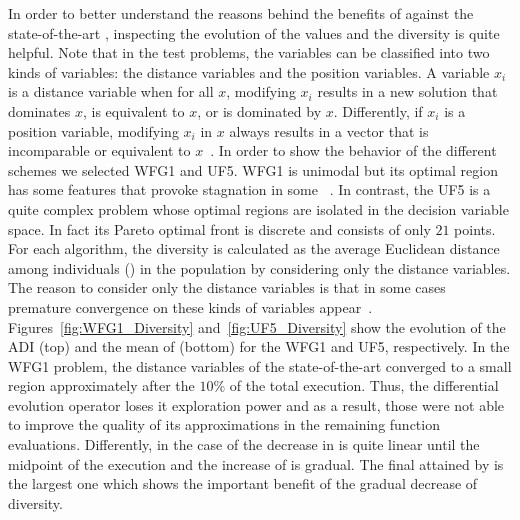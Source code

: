 In order to better understand the reasons behind the benefits of \AVSDMOEAD{} against the state-of-the-art \MOEAS{},
inspecting the evolution of the \HV{} values and the diversity is quite helpful.
%
Note that in the \WFG{} test problems, the variables can be classified into two kinds of variables: 
the distance variables and the position variables.
%
A variable $x_i$ is a distance variable when for all $x$, modifying $x_i$ results in a new solution 
that dominates $x$, is equivalent to $x$, or is dominated by $x$.
%
Differently, if $x_i$ is a position variable, modifying $x_i$ in $x$ always results in a vector that is 
incomparable or equivalent to $x$~\cite{huband2006review}.
%
In order to show the behavior of the different schemes we selected WFG1 and UF5.
%
WFG1 is unimodal but its optimal region has some features that provoke stagnation in some \MOEAS{}~\cite{castillo2017multi}.
%
In contrast, the UF5 is a quite complex problem whose optimal regions are isolated in the decision variable 
space.
%
In fact its Pareto optimal front is discrete and consists of only $21$ points.
%
For each algorithm, the diversity is calculated as the average Euclidean distance among individuals (\ADI{}) in the population 
by considering only the distance variables.
%
The reason to consider only the distance variables is that in some cases premature convergence on these kinds of 
variables appear~\cite{castillo2017multi}.
%
Figures~\ref{fig:WFG1_Diversity} and~\ref{fig:UF5_Diversity} show the evolution of the ADI (top) and the mean of \HV{} (bottom) 
for the WFG1 and UF5, respectively.
%
In the WFG1 problem, the distance variables of the state-of-the-art \MOEAS{} converged to a small region 
approximately after the $10\%$ of the total execution.
%
Thus, the differential evolution operator loses it exploration power and as a result,
those \MOEAS{} were not able to improve the quality of its approximations in the remaining function evaluations. 
%
Differently, in the case of \AVSDMOEAD{} the decrease in \ADI{} is quite linear until the midpoint of the execution and
the increase of \HV{} is gradual.
%
The final \HV{} attained by \AVSDMOEAD{} is the largest one which shows the important benefit
of the gradual decrease of diversity.

